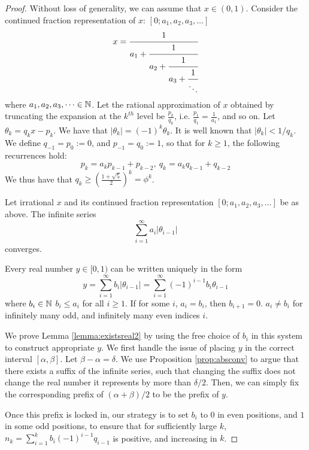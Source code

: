 \begin{proof}
Without loss of generality, we can assume that $x \in (0, 1)$. Consider the continued fraction representation of $x$: $[0; a_1, a_2, a_3, \dots]$
$$
x = \cfrac{1}{a_1 + \cfrac{1}{a_2 + \cfrac{1}{a_3 + \cfrac{1}{\ddots}}}}
$$
where $a_1, a_2, a_3, \dots \in \mathbb{N}$. Let the rational approximation of $x$ obtained by truncating the expansion at the $k^{th}$ level be $\frac{p_k}{q_k}$, i.e. $\frac{p_1}{q_1} = \frac{1}{a_1}$, and so on. Let $\theta_k = q_k x -p_k$. We have that $|\theta_k| = (-1)^k\theta_k$. It is well known that $|\theta_k| < 1/q_k$. We define $q_{-1} = p_0 := 0$, and $p_{-1} = q_0 := 1$, so that for $k \ge 1$, the following recurrences hold:
$$
p_k = a_kp_{k-1} + p_{k-2}, ~ q_k = a_kq_{k-1} + q_{k-2}
$$
We thus have that $q_k \ge \left(\frac{1 + \sqrt{5}}{2}\right)^k = \phi^k$.

\begin{proposition}
\label{prop:absconv}
Let irrational $x$ and its continued fraction representation $[0; a_1, a_2, a_3, \dots]$ be as above. The infinite series 
$$
\sum_{i=1}^\infty a_i |\theta_{i-1}|
$$
converges.
\end{proposition}

\begin{proposition}
\label{prop:numsys}
Every real number $y \in [0, 1)$ can be written uniquely in the form
$$
y = \sum_{i=1}^\infty b_i |\theta_{i-1}| = \sum_{i=1}^\infty (-1)^{i-1}b_i \theta_{i-1} 
$$
where $b_i \in \mathbb{N}$ $b_i \le a_i$ for all $i \ge 1$. If for some $i$, $a_i = b_i$, then $b_{i+1} = 0$. $a_i \ne b_i$ for infinitely many odd, and infinitely many even indices $i$.
\end{proposition}

We prove Lemma \ref{lemma:existsreal2} by using the free choice of $b_i$ in this system to construct appropriate $y$. We first handle the issue of placing $y$ in the correct interval $[\alpha, \beta]$. Let $\beta - \alpha = \delta$. We use Proposition \ref{prop:absconv} to argue that there exists a suffix of the infinite series, such that changing the suffix does not change the real number it represents by more than $\delta/2$. Then, we can simply fix the corresponding prefix of $(\alpha + \beta)/2$ to be the prefix of $y$.

Once this prefix is locked in, our strategy is to set $b_i$ to $0$ in even positions, and $1$ in some odd positions, to ensure that for sufficiently large $k$, $n_k = \sum_{i=1}^k b_i (-1)^{i-1}q_{i-1}$ is positive, and increasing in $k$.


\end{proof}
